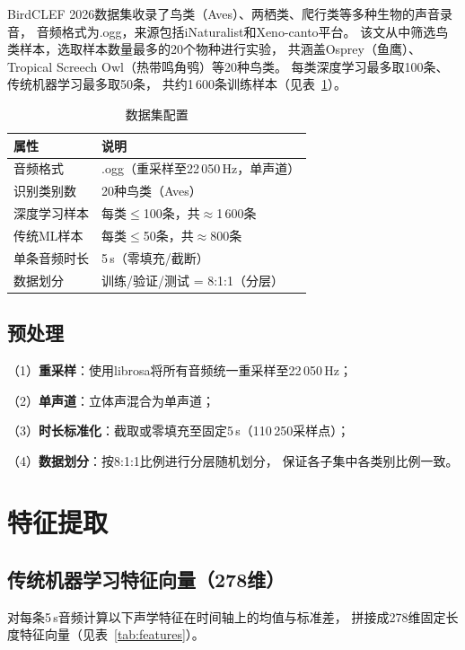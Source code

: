 \documentclass[10pt,twoside,twocolumn]{article}
\begin{document}
BirdCLEF 2026数据集收录了鸟类（Aves）、两栖类、爬行类等多种生物的声音录音，
音频格式为.ogg，来源包括iNaturalist和Xeno-canto平台。
该文从中筛选鸟类样本，选取样本数量最多的20个物种进行实验，
共涵盖Osprey（鱼鹰）、Tropical Screech Owl（热带鸣角鸮）等20种鸟类。
每类深度学习最多取100条、传统机器学习最多取50条，
共约1\,600条训练样本（见表~\ref{tab:dataset}）。

\begin{table}[h]
\caption{数据集配置}
\label{tab:dataset}
\centering{}
\begin{tabular}{ll}
\toprule
属性 & 说明 \\
\midrule
音频格式 & .ogg（重采样至22\,050\,Hz，单声道）\\
识别类别数 & 20种鸟类（Aves） \\
深度学习样本 & 每类$\leq$100条，共$\approx$1\,600条 \\
传统ML样本 & 每类$\leq$50条，共$\approx$800条 \\
单条音频时长 & 5\,s（零填充/截断） \\
数据划分 & 训练/验证/测试 = 8:1:1（分层） \\
\bottomrule
\end{tabular}
\end{table}

\subsection{预处理}

（1）\textbf{重采样}：使用librosa将所有音频统一重采样至22\,050\,Hz；

（2）\textbf{单声道}：立体声混合为单声道；

（3）\textbf{时长标准化}：截取或零填充至固定5\,s（110\,250采样点）；

（4）\textbf{数据划分}：按8:1:1比例进行分层随机划分，
保证各子集中各类别比例一致。

\section{特征提取}

\subsection{传统机器学习特征向量（278维）}

对每条5\,s音频计算以下声学特征在时间轴上的均值与标准差，
拼接成278维固定长度特征向量（见表~\ref{tab:features}）。
\end{document}
